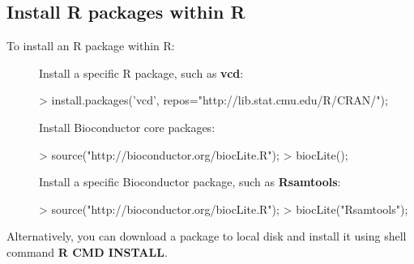 \documentclass{article}
\begin{document}
\subsection{Install R packages within R}
To install an R package within R:
\begin{description}
\item[] Install a specific R package, such as \textbf{vcd}:
\begin{Schunk}
\begin{Sinput}
> install.packages('vcd', repos="http://lib.stat.cmu.edu/R/CRAN/");
\end{Sinput}
\end{Schunk}

\item[] Install Bioconductor core packages:
\begin{Schunk}
\begin{Sinput}
> source("http://bioconductor.org/biocLite.R");
> biocLite();
\end{Sinput}
\end{Schunk}

\item[] Install a specific Bioconductor package, such as \textbf{Rsamtools}:
\begin{Schunk}
\begin{Sinput}
> source("http://bioconductor.org/biocLite.R");
> biocLite("Rsamtools");
\end{Sinput}
\end{Schunk}
\end{description}
Alternatively, you can download a package to local disk and install it using shell command \textbf{R CMD INSTALL}.
\end{document}
